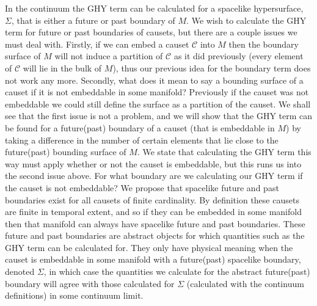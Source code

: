 \documentclass[12pt]{article}
\begin{document}
In the continuum the GHY term can be calculated for a spacelike hypersurface, $\Sigma$, that is either a future or past boundary of $M$. We wish to calculate the GHY term for future or past boundaries of causets, but there are a couple issues we must deal with. Firstly, if we can embed a causet $\mathcal{C}$ into $M$ then the boundary surface of $M$ will not induce a partition of $\mathcal{C}$ as it did previously (every element of $\mathcal{C}$ will lie in the bulk of $M$), thus our previous idea for the boundary term does not work any more. Secondly, what does it mean to say a bounding surface of a causet if it is not embeddable in some manifold? Previously if the causet was not embeddable we could still define the surface as a partition of the causet. We shall see that the first issue is not a problem, and we will show that the GHY term can be found for a future(past) boundary of a causet (that is embeddable in $M$) by taking a difference in the number of certain elements that lie close to the future(past) bounding surface of $M$. We state that calculating the GHY term this way must apply whether or not the causet is embeddable, but this runs us into the second issue above. For what boundary are we calculating our GHY term if the causet is not embeddable? We propose that spacelike future and past boundaries exist for all causets of finite cardinality. By definition these causets are finite in temporal extent, and so if they can be embedded in some manifold then that manifold can always have spacelike future and past boundaries. These future and past boundaries are abstract objects for which quantities such as the GHY term can be calculated for. They only have physical meaning when the causet is embeddable in some manifold with a future(past) spacelike boundary, denoted $\Sigma$, in which case the quantities we calculate for the abstract future(past) boundary will agree with those calculated for $\Sigma$ (calculated with the continuum definitions) in some continuum limit.
\end{document}
